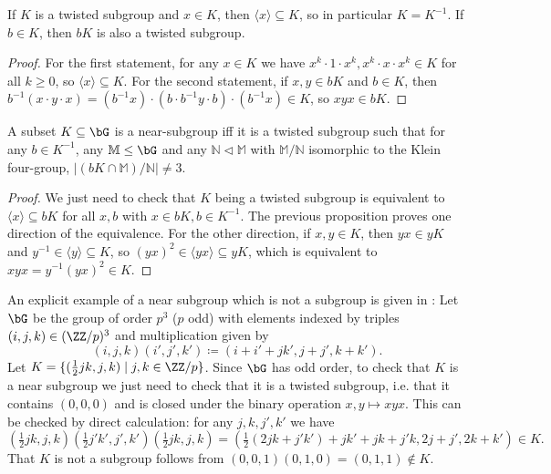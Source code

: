 \begin{prop} If $K$ is a twisted subgroup and $x \in K$, then $\langle x \rangle \subseteq K$, so in particular $K = K^{-1}$. If $b \in K$, then $bK$ is also a twisted subgroup.
\end{prop}
\begin{proof} For the first statement, for any $x \in K$ we have $x^k\cdot 1\cdot x^k, x^k\cdot x\cdot x^k \in K$ for all $k \ge 0$, so $\langle x \rangle \subseteq K$. For the second statement, if $x,y \in bK$ and $b \in K$, then $b^{-1}(x\cdot y\cdot x) = (b^{-1}x) \cdot (b\cdot b^{-1}y \cdot b) \cdot (b^{-1}x) \in K$, so $xyx \in bK$.
\end{proof}

\begin{prop} A subset $K \subseteq \bG$ is a near-subgroup iff it is a twisted subgroup such that for any $b \in K^{-1}$, any $\mathbb{M} \le \bG$ and any $\mathbb{N} \lhd \mathbb{M}$ with $\mathbb{M}/\mathbb{N}$ isomorphic to the Klein four-group, $|(bK\cap \mathbb{M})/\mathbb{N}| \ne 3$.
\end{prop}
\begin{proof} We just need to check that $K$ being a twisted subgroup is equivalent to $\langle x\rangle \subseteq bK$ for all $x,b$ with $x \in bK, b \in K^{-1}$. The previous proposition proves one direction of the equivalence. For the other direction, if $x,y \in K$, then $yx \in yK$ and $y^{-1} \in \langle y \rangle \subseteq K$, so $(yx)^2 \in \langle yx\rangle \subseteq yK$, which is equivalent to $xyx = y^{-1}(yx)^2 \in K$.
\end{proof}

\begin{ex} An explicit example of a near subgroup which is not a subgroup is given in \cite{feder-vardi}: Let $\bG$ be the group of order $p^3$ ($p$ odd) with elements indexed by triples $(i,j,k) \in (\ZZ/p)^3$ and multiplication given by
\[
(i,j,k)(i',j',k') \coloneqq (i+i'+jk',j+j',k+k').
\]
Let $K = \{(\tfrac{1}{2}jk,j,k) \mid j,k \in \ZZ/p\}$. Since $\bG$ has odd order, to check that $K$ is a near subgroup we just need to check that it is a twisted subgroup, i.e. that it contains $(0,0,0)$ and is closed under the binary operation $x,y \mapsto xyx$. This can be checked by direct calculation: for any $j,k,j',k'$ we have
\[
(\tfrac{1}{2}jk,j,k)(\tfrac{1}{2}j'k',j',k')(\tfrac{1}{2}jk,j,k) = (\tfrac{1}{2}(2jk+j'k')+jk'+jk+j'k,2j+j',2k+k') \in K.
\]
That $K$ is not a subgroup follows from $(0,0,1)(0,1,0) = (0,1,1) \not\in K$.
\end{ex}

